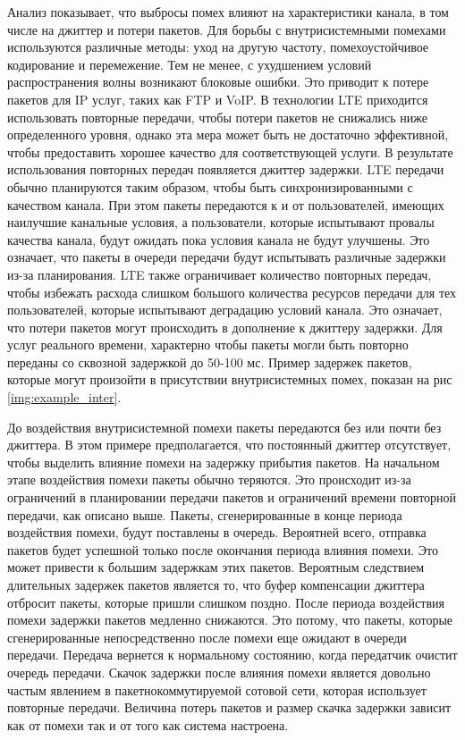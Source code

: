 Анализ показывает, что выбросы помех влияют на характеристики канала, в том числе на джиттер и потери пакетов.
Для борьбы с внутрисистемными помехами используются различные методы: уход на другую частоту, помехоустойчивое кодирование и перемежение. 
Тем не менее, с ухудшением условий распространения волны возникают блоковые ошибки. 
Это приводит к потере пакетов для IP услуг, таких как FTP и VoIP. В технологии LTE приходится использовать повторные передачи, чтобы потери пакетов не снижались ниже определенного уровня, однако эта мера может быть не достаточно эффективной, чтобы предоставить хорошее качество для соответствующей услуги. В результате использования повторных передач появляется джиттер задержки.
LTE передачи обычно планируются таким образом, чтобы быть синхронизированными с качеством канала. При этом пакеты передаются к и от пользователей, имеющих наилучшие канальные условия, а пользователи, которые испытывают провалы качества канала, будут ожидать пока условия канала не будут улучшены. Это означает, что пакеты в очереди передачи будут испытывать различные задержки из-за планирования.
LTE также ограничивает количество повторных передач, чтобы избежать расхода слишком большого количества ресурсов передачи для тех пользователей, которые испытывают деградацию условий канала. Это означает, что потери пакетов могут происходить в дополнение к джиттеру задержки. Для услуг реального времени, характерно чтобы пакеты могли быть повторно переданы со сквозной задержкой до 50-100 мс.
Пример задержек пакетов, которые могут произойти в присутствии внутрисистемных помех, показан на рис \ref{img:example_inter}.






До воздействия внутрисистемной помехи пакеты передаются без или почти без джиттера. В этом примере предполагается, что постоянный джиттер отсутствует, чтобы выделить влияние помехи на задержку прибытия пакетов.
На начальном этапе воздействия помехи пакеты обычно теряются. Это происходит из-за ограничений в планировании передачи пакетов и ограничений времени повторной передачи, как описано выше.
Пакеты, сгенерированные в конце периода воздействия помехи, будут поставлены в очередь. Вероятней всего, отправка пакетов будет успешной только после окончания периода влияния помехи. 
Это может привести к большим задержкам этих пакетов. 
Вероятным следствием длительных задержек пакетов является то, что буфер компенсации джиттера отбросит пакеты, которые пришли слишком поздно.
После периода воздействия помехи задержки пакетов медленно снижаются. Это потому, что пакеты, которые сгенерированные непосредственно после помехи еще ожидают в очереди передачи.
Передача вернется к нормальному состоянию, когда передатчик очистит очередь передачи.
Скачок задержки после влияния помехи является довольно частым явлением в пакетнокоммутируемой сотовой сети, которая использует повторные передачи. 
Величина потерь пакетов и размер скачка задержки зависит как от помехи так и от того как система настроена.

